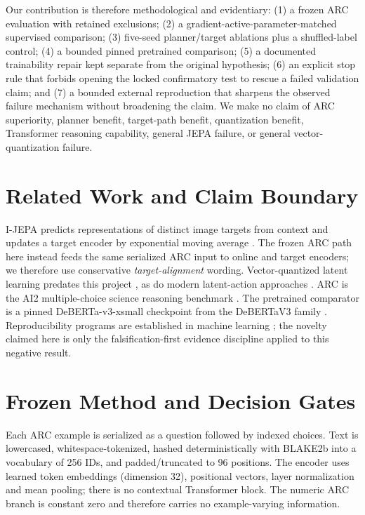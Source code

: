 \documentclass[10pt,conference]{IEEEtran}
\begin{document}
Our contribution is therefore methodological and evidentiary: (1) a frozen ARC evaluation with retained exclusions; (2) a gradient-active-parameter-matched supervised comparison; (3) five-seed planner/target ablations plus a shuffled-label control; (4) a bounded pinned pretrained comparison; (5) a documented trainability repair kept separate from the original hypothesis; (6) an explicit stop rule that forbids opening the locked confirmatory test to rescue a failed validation claim; and (7) a bounded external reproduction that sharpens the observed failure mechanism without broadening the claim. We make no claim of ARC superiority, planner benefit, target-path benefit, quantization benefit, Transformer reasoning capability, general JEPA failure, or general vector-quantization failure.

\section{Related Work and Claim Boundary}
I-JEPA predicts representations of distinct image targets from context and updates a target encoder by exponential moving average \cite{assran2023ijepa}. The frozen ARC path here instead feeds the same serialized ARC input to online and target encoders; we therefore use conservative \emph{target-alignment} wording. Vector-quantized latent learning predates this project \cite{vandenOord2017vqvae}, as do modern latent-action approaches \cite{ye2024lapa}. ARC is the AI2 multiple-choice science reasoning benchmark \cite{clark2018arc}. The pretrained comparator is a pinned DeBERTa-v3-xsmall checkpoint from the DeBERTaV3 family \cite{he2023debertav3}. Reproducibility programs are established in machine learning \cite{pineau2021reproducibility}; the novelty claimed here is only the falsification-first evidence discipline applied to this negative result.

\section{Frozen Method and Decision Gates}
Each ARC example is serialized as a question followed by indexed choices. Text is lowercased, whitespace-tokenized, hashed deterministically with BLAKE2b into a vocabulary of 256 IDs, and padded/truncated to 96 positions. The encoder uses learned token embeddings (dimension 32), positional vectors, layer normalization and mean pooling; there is no contextual Transformer block. The numeric ARC branch is constant zero and therefore carries no example-varying information.
\end{document}
